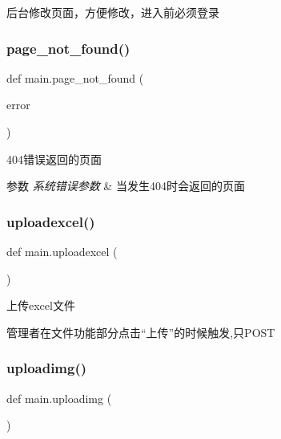 后台修改页面，方便修改，进入前必须登录 \mbox{\label{group___xE8_xB7_xAF_xE7_x94_xB1_xE5_x87_xBD_xE6_x95_xB0_ga965cff435fee73194b14e9a6a7f3f2b8}} 
\subsubsection{\texorpdfstring{page\_not\_found()}{page\_not\_found()}}
{\footnotesize\ttfamily def main.\+page\+\_\+not\+\_\+found (\begin{DoxyParamCaption}\item[{}]{error }\end{DoxyParamCaption})}



404错误返回的页面 


\begin{DoxyParams}{参数}
{\em 系统错误参数} & 当发生404时会返回的页面 \\
\hline
\end{DoxyParams}
\mbox{\label{group___xE8_xB7_xAF_xE7_x94_xB1_xE5_x87_xBD_xE6_x95_xB0_gadc4862ff2e8d5f1dee064a0b2f9f3dc9}} 
\subsubsection{\texorpdfstring{uploadexcel()}{uploadexcel()}}
{\footnotesize\ttfamily def main.\+uploadexcel (\begin{DoxyParamCaption}{ }\end{DoxyParamCaption})}



上传excel文件 

管理者在文件功能部分点击“上传”的时候触发,只\+P\+O\+ST \mbox{\label{group___xE8_xB7_xAF_xE7_x94_xB1_xE5_x87_xBD_xE6_x95_xB0_gad28764d44d01ada36ff0dfbbcac903d5}} 
\subsubsection{\texorpdfstring{uploadimg()}{uploadimg()}}
{\footnotesize\ttfamily def main.\+uploadimg (\begin{DoxyParamCaption}{ }\end{DoxyParamCaption})}



